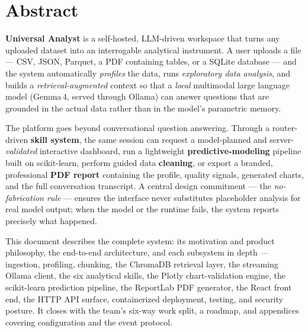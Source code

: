 \chapter*{Abstract}

\begin{tcolorbox}[enhanced,colback=uaMist,colframe=uaIndigo,boxrule=0pt,leftrule=4pt,
  arc=2pt,left=14pt,right=14pt,top=12pt,bottom=12pt]
\setlength{\parindent}{0pt}
\textbf{\large\color{uaIndigoD}Universal Analyst} is a self-hosted, LLM-driven
workspace that turns any uploaded dataset into an interrogable analytical
instrument. A user uploads a file --- CSV, JSON, Parquet, a PDF containing
tables, or a SQLite database --- and the system automatically \emph{profiles}
the data, runs \emph{exploratory data analysis}, and builds a
\emph{retrieval-augmented} context so that a \emph{local} multimodal large
language model (Gemma\,4, served through Ollama) can answer questions that are
grounded in the actual data rather than in the model's parametric memory.
\end{tcolorbox}

\vspace{6pt}
The platform goes beyond conversational question answering. Through a
router-driven \textbf{skill system}, the same session can request a
model-planned and server-\emph{validated} interactive dashboard, run a
lightweight \textbf{predictive-modeling} pipeline built on scikit-learn, perform
guided data \textbf{cleaning}, or export a branded, professional \textbf{PDF
report} containing the profile, quality signals, generated charts, and the full
conversation transcript. A central design commitment --- the \emph{no-fabrication
rule} --- ensures the interface never substitutes placeholder analysis for real
model output; when the model or the runtime fails, the system reports precisely
what happened.

This document describes the complete system: its motivation and product
philosophy, the end-to-end architecture, and each subsystem in depth ---
ingestion, profiling, chunking, the ChromaDB retrieval layer, the streaming
Ollama client, the six analytical skills, the Plotly chart-validation engine,
the scikit-learn prediction pipeline, the ReportLab PDF generator, the React
front end, the HTTP API surface, containerized deployment, testing, and
security posture. It closes with the team's six-way work split, a roadmap, and
appendices covering configuration and the event protocol.

